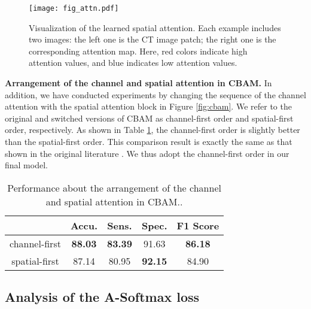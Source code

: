 \documentclass[final,5p,times,twocolumn]{elsarticle}
\begin{document}
\begin{figure*}
\centering
\texttt{[image: fig\_attn.pdf]} \\
\caption{Visualization of the learned spatial attention. Each example includes two images: the left one is the CT image patch; the right one is the corresponding attention map. Here, red colors indicate high attention values, and blue indicates low attention values.}
\label{fig:visatt}
\end{figure*}

\textbf{Arrangement of the channel and spatial attention in CBAM.} 
In addition, we have conducted experiments by changing the sequence of the channel attention with the spatial attention block in Figure \ref{fig:cbam}. We refer to the original and switched versions of CBAM as channel-first order and spatial-first order, respectively. As shown in Table \ref{tab:cbam}, the channel-first order is slightly better than the spatial-first order. This comparison result is exactly the same as that shown in the original literature \cite{Woo2018CBAM}. We thus adopt the channel-first order in our final model. 

\begin{table}
\centering
\caption{Performance about the arrangement of the channel and spatial attention in CBAM..}
\small
\label{tab:cbam}
\begin{tabular}{c|cccc}
\toprule
& Accu.	& Sens.	& Spec.	& F1 Score \\
\midrule	
channel-first & 	\textbf{88.03}	& \textbf{83.39}	& 91.63	& \textbf{86.18} \\
spatial-first & 	87.14	& 80.95	& \textbf{92.15}	& 84.90 \\
\bottomrule												
\end{tabular}
\end{table}


\subsection{Analysis of the A-Softmax loss}
\label{ssec:exp_sphere}
\end{document}
